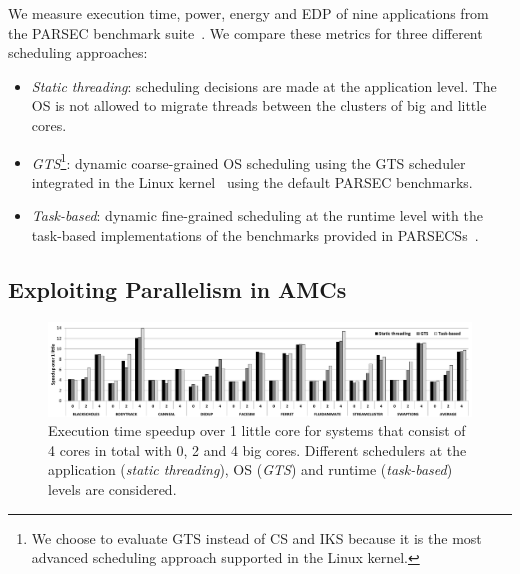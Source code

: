 We measure execution time, power, energy and EDP of nine applications from the PARSEC benchmark suite~\cite{Bienia:PhD2011}. 
We compare these metrics for three different scheduling approaches:
\begin{itemize}
\item \textit{Static threading}: scheduling decisions are made at the application level. The OS is not allowed to migrate threads between the clusters of big and little cores. 
\item \textit{GTS}\footnote{We choose to evaluate GTS instead of CS and IKS because it is the most advanced scheduling approach supported in the Linux kernel.}: dynamic coarse-grained OS scheduling 
using the GTS scheduler integrated in the Linux kernel~\cite{samsung, ARM} using the default 
PARSEC benchmarks. 
\item \textit{Task-based}: dynamic fine-grained scheduling at the runtime level with the task-based implementations of the benchmarks provided in PARSECSs~\cite{Chasapis:TACO2016}.
\end{itemize}


\subsection{Exploiting Parallelism in AMCs}
\label{sec:eval:A}

\begin{figure}[t]%
	\centering
	\includegraphics[width=1.0\textwidth]{figures/speedup-4.pdf}
	\caption{Execution time speedup over 1 little core for systems that consist of 4 cores in 
		total with 0, 2 and 4 big cores. Different schedulers at the application (\textit{static 
			threading}), OS  (\textit{GTS}) and runtime (\textit{task-based}) levels are considered.}
	\label{fig:speedup4}%
\end{figure}



